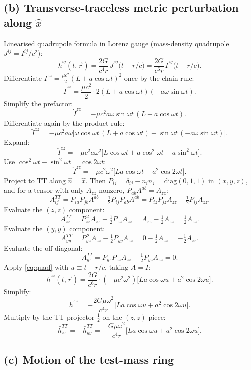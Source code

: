 \documentclass[11pt]{article}
\begin{document}
\subsection*{(b) Transverse-traceless metric perturbation along $\hat x$}

Linearised quadrupole formula in Lorenz gauge (mass-density quadrupole $J^{ij}=I^{ij}/c^2$):
\begin{equation}
\bar h^{ij}(t,\vec r)=\frac{2G}{c^4 r}\,\ddot J^{\,ij}\!\bigl(t-r/c\bigr)=\frac{2G}{c^6 r}\,\ddot I^{\,ij}\!\bigl(t-r/c\bigr).
\label{eq:quad}
\end{equation}
Differentiate $I^{zz}=\tfrac{\mu c^2}{2}(L+a\cos\omega t)^2$ once by the chain rule:
\[
\dot I^{zz}=\frac{\mu c^2}{2}\cdot 2(L+a\cos\omega t)(-a\omega\sin\omega t).
\]
Simplify the prefactor:
\[
\dot I^{zz}=-\mu c^2 a\omega\sin\omega t\,(L+a\cos\omega t).
\]
Differentiate again by the product rule:
\[
\ddot I^{zz}=-\mu c^2 a\omega\bigl[\omega\cos\omega t\,(L+a\cos\omega t)+\sin\omega t\,(-a\omega\sin\omega t)\bigr].
\]
Expand:
\[
\ddot I^{zz}=-\mu c^2 a\omega^2\bigl[L\cos\omega t+a\cos^2\omega t-a\sin^2\omega t\bigr].
\]
Use $\cos^2\omega t-\sin^2\omega t=\cos 2\omega t$:
\[
\ddot I^{zz}=-\mu c^2\omega^2\bigl[La\cos\omega t+a^2\cos 2\omega t\bigr].
\]
Project to TT along $\hat n=\hat x$. Then $P_{ij}=\delta_{ij}-n_i n_j=\mathrm{diag}(0,1,1)$ in $(x,y,z)$, and for a tensor with only $A_{zz}$ nonzero, $P_{ab}A^{ab}=A_{zz}$:
\[
A^{TT}_{ij}=P_{ia}P_{jb}A^{ab}-\tfrac12 P_{ij}P_{ab}A^{ab}=P_{iz}P_{jz}A_{zz}-\tfrac12 P_{ij}A_{zz}.
\]
Evaluate the $(z,z)$ component:
\[
A^{TT}_{zz}=P_{zz}^{\,2}A_{zz}-\tfrac12 P_{zz}A_{zz}=A_{zz}-\tfrac12 A_{zz}=\tfrac12 A_{zz}.
\]
Evaluate the $(y,y)$ component:
\[
A^{TT}_{yy}=P_{yz}^{\,2}A_{zz}-\tfrac12 P_{yy}A_{zz}=0-\tfrac12 A_{zz}=-\tfrac12 A_{zz}.
\]
Evaluate the off-diagonal:
\[
A^{TT}_{yz}=P_{yz}P_{zz}A_{zz}-\tfrac12 P_{yz}A_{zz}=0.
\]
Apply \eqref{eq:quad} with $u\equiv t-r/c$, taking $A=\ddot I$:
\[
\bar h^{zz}(t,\vec r)=\frac{2G}{c^6 r}\cdot(-\mu c^2\omega^2)\bigl[La\cos\omega u+a^2\cos 2\omega u\bigr].
\]
Simplify:
\[
\bar h^{zz}=-\frac{2G\mu\omega^2}{c^4 r}\bigl[La\cos\omega u+a^2\cos 2\omega u\bigr].
\]
Multiply by the TT projector $\tfrac12$ on the $(z,z)$ piece:
\begin{equation}
\boxed{\ \bar h^{TT}_{zz}=-\bar h^{TT}_{yy}=-\frac{G\mu\omega^2}{c^4 r}\bigl[La\cos\omega u+a^2\cos 2\omega u\bigr].\ }
\label{eq:hTTbox}
\end{equation}

\subsection*{(c) Motion of the test-mass ring}
\end{document}
